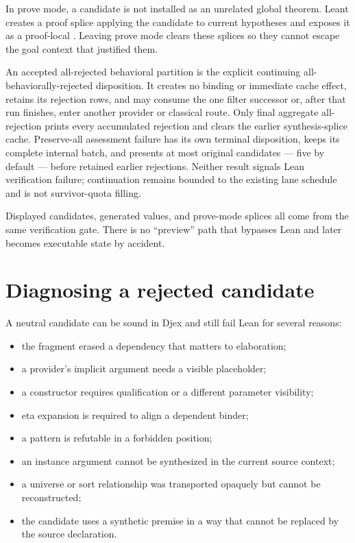 \documentclass[10pt,letterpaper,oneside]{report}
\newcommand{\code}[1]{\texttt{\detokenize{#1}}}
\begin{document}
In prove mode, a candidate is not installed as an unrelated global theorem. Leant creates a proof splice applying the candidate to current hypotheses and exposes it as a proof-local \code{itN}. Leaving prove mode clears these splices so they cannot escape the goal context that justified them.

An accepted all-rejected behavioral partition is the explicit continuing
all-behaviorally-rejected disposition. It creates no binding or immediate cache
effect, retains its rejection rows, and may consume the one filter successor or,
after that run finishes, enter another provider or classical route. Only final
aggregate all-rejection prints every accumulated rejection and clears the
earlier synthesis-splice cache. Preserve-all assessment failure has
its own terminal disposition, keeps its complete internal batch, and presents
at most \code{synth-shown} original candidates --- five by default --- before
retained earlier rejections. Neither
result signals Lean verification failure; continuation remains bounded to the
existing lane schedule and is not survivor-quota filling.

\begin{invariantbox}
Displayed candidates, generated \code{it} values, and prove-mode splices all come from the same verification gate. There is no ``preview'' path that bypasses Lean and later becomes executable state by accident.
\end{invariantbox}

\section{Diagnosing a rejected candidate}

A neutral candidate can be sound in Djex and still fail Lean for several reasons:

\begin{itemize}
  \item the fragment erased a dependency that matters to elaboration;
  \item a provider's implicit argument needs a visible placeholder;
  \item a constructor requires qualification or a different parameter visibility;
  \item eta expansion is required to align a dependent binder;
  \item a pattern is refutable in a forbidden position;
  \item an instance argument cannot be synthesized in the current source context;
  \item a universe or sort relationship was transported opaquely but cannot be reconstructed;
  \item the candidate uses a synthetic premise in a way that cannot be replaced by the source declaration.
\end{itemize}
\end{document}
